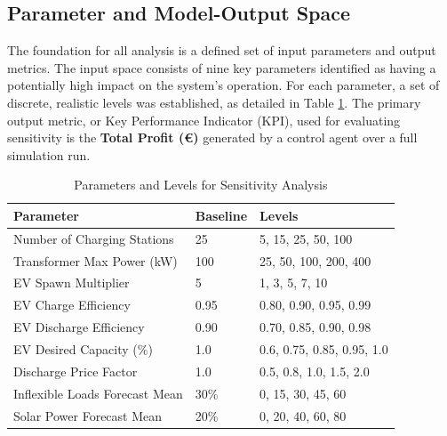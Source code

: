 \subsection{Parameter and Model-Output Space}
\noindent
The foundation for all analysis is a defined set of input parameters and output metrics. The input space consists of nine key parameters identified as having a potentially high impact on the system's operation. For each parameter, a set of discrete, realistic levels was established, as detailed in Table \ref{tab:sa_parameters_detailed}. The primary output metric, or Key Performance Indicator (KPI), used for evaluating sensitivity is the \textbf{Total Profit (€)} generated by a control agent over a full simulation run.

\begin{table}[H]
    \centering
    \caption{Parameters and Levels for Sensitivity Analysis}
    \label{tab:sa_parameters_detailed}
    \begin{tabular}{|l|l|l|}
        \hline
        \textbf{Parameter} & \textbf{Baseline} & \textbf{Levels} \\ \hline
        Number of Charging Stations & 25 & 5, 15, 25, 50, 100 \\ \hline
        Transformer Max Power (kW) & 100 & 25, 50, 100, 200, 400 \\ \hline
        EV Spawn Multiplier & 5 & 1, 3, 5, 7, 10 \\ \hline
        EV Charge Efficiency & 0.95 & 0.80, 0.90, 0.95, 0.99 \\ \hline
        EV Discharge Efficiency & 0.90 & 0.70, 0.85, 0.90, 0.98 \\ \hline
        EV Desired Capacity (\%) & 1.0 & 0.6, 0.75, 0.85, 0.95, 1.0 \\ \hline
        Discharge Price Factor & 1.0 & 0.5, 0.8, 1.0, 1.5, 2.0 \\ \hline
        Inflexible Loads Forecast Mean & 30\% & 0, 15, 30, 45, 60 \\ \hline
        Solar Power Forecast Mean & 20\% & 0, 20, 40, 60, 80 \\ \hline
    \end{tabular}
\end{table}


